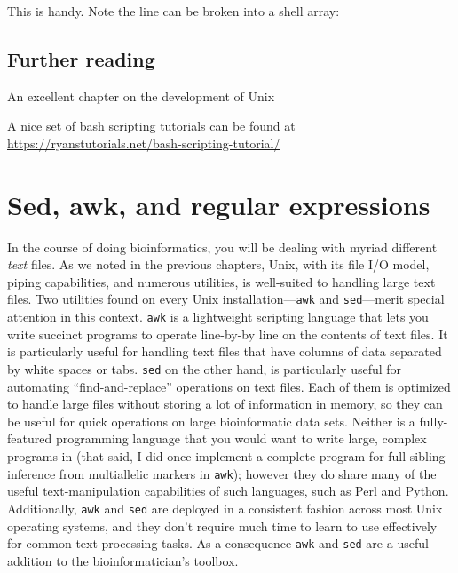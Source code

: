 \documentclass[]{krantz}
\makeatletter
\newenvironment{Shaded}{\begin{snugshade}}{\end{snugshade}}
\newcommand{\BuiltInTok}[1]{#1}
\newcommand{\CommentTok}[1]{\textcolor[rgb]{0.37,0.37,0.37}{\textit{#1}}}
\newcommand{\FunctionTok}[1]{\textcolor[rgb]{0,0,0}{#1}}
\newcommand{\KeywordTok}[1]{\textcolor[rgb]{0.27,0.27,0.27}{\textbf{#1}}}
\newcommand{\NormalTok}[1]{#1}
\newcommand{\VariableTok}[1]{\textcolor[rgb]{0,0,0}{#1}}
\newenvironment{kframe}{%
\medskip{}
\setlength{\fboxsep}{.8em}
 \def\at@end@of@kframe{}%
 \ifinner\ifhmode%
  \def\at@end@of@kframe{\end{minipage}}%
  \begin{minipage}{\columnwidth}%
 \fi\fi%
 \def\FrameCommand##1{\hskip\@totalleftmargin \hskip-\fboxsep
 \colorbox{shadecolor}{##1}\hskip-\fboxsep
     \hskip-\linewidth \hskip-\@totalleftmargin \hskip\columnwidth}%
 \MakeFramed {\advance\hsize-\width
   \@totalleftmargin\z@ \linewidth\hsize
   \@setminipage}}%
 {\par\unskip\endMakeFramed%
 \at@end@of@kframe}
\renewenvironment{Shaded}{\begin{kframe}}{\end{kframe}}
\makeatother
\begin{document}
This is handy. Note the line can be broken into a shell array:

\begin{Shaded}
\end{Shaded}

\hypertarget{further-reading}{%
\section{Further reading}\label{further-reading}}

An excellent chapter on the development of Unix \citep{RaymondArtUNIXProgramming2003}

A nice set of bash scripting tutorials can be found at
\url{https://ryanstutorials.net/bash-scripting-tutorial/}

\hypertarget{sed-awk-and-regular-expressions}{%
\chapter{Sed, awk, and regular expressions}\label{sed-awk-and-regular-expressions}}

In the course of doing bioinformatics, you will be dealing with myriad different
\emph{text} files. As we noted in the previous chapters, Unix, with its file I/O model,
piping capabilities, and numerous utilities, is well-suited to handling
large text files. Two utilities found on every Unix installation---\texttt{awk} and \texttt{sed}---merit
special attention in this context. \texttt{awk} is a lightweight scripting language that lets
you write succinct programs to operate line-by-by line on the contents of text files. It is
particularly useful for handling text files that have columns of data separated by white spaces
or tabs. \texttt{sed} on the other hand, is particularly useful for automating
``find-and-replace'' operations on text files. Each of them is optimized to
handle large files without storing a lot of information in memory, so they can be
useful for quick operations on large bioinformatic data sets. Neither is a fully-featured
programming language that you would want to write large, complex programs in (that said,
I did once implement a complete program for full-sibling inference from multiallelic markers
in \texttt{awk}); however they do share many of the
useful text-manipulation capabilities of such languages, such as Perl and Python. Additionally,
\texttt{awk} and \texttt{sed} are deployed in a consistent fashion across most Unix operating systems, and they
don't require much time to learn to use effectively for common text-processing tasks.
As a consequence \texttt{awk} and \texttt{sed} are a useful addition to the bioinformatician's toolbox.
\end{document}
